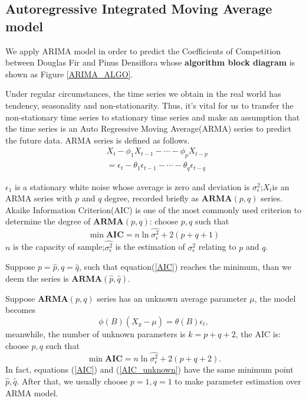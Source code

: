 \documentclass{mcmthesis}
\numberwithin{figure}{section}
\numberwithin{table}{section}
\numberwithin{equation}{section}
\begin{document}
\subsection{Autoregressive Integrated Moving Average model}

We apply ARIMA model in order to predict the Coefficients of Competition between 
Douglas Fir and Pinus Densiflora whose \textbf{algorithm block diagram} 
is shown as Figure \ref{ARIMA_ALGO}.
\par
Under regular circumstances, the time series we obtain in the real world
  has tendency, seasonality and non-stationarity. Thus, it's vital for 
  us to transfer the non-stationary time series to stationary time series
  and make an assumption that the time series is an Auto 
  Regressive Moving Average(ARMA) series to predict the 
  future data. ARMA series is defined as follows.
  \begin{align*}
    &X_t-\phi_1X_{t-1}-\cdots -\phi_pX_{t-p} \\
    &= \epsilon_t - \theta_1\epsilon_{t-1}-\cdots-\theta_q\epsilon_{t-q}
  \end{align*}
 
$ \epsilon_1 $ is a stationary white noise whose average is zero and
deviation is $ \sigma_\epsilon^2 $;$ X_t $is an ARMA series with $ p $ and $ q $
degree, recorded briefly as $ \mathbf{ARMA}(p,q) $ series.
Akaike Information Criterion(AIC) is one of the most commonly used
criterion to determine the degree of $ \mathbf{ARMA}(p,q) $: choose 
$ p,q $ such that 
\begin{equation}\label{AIC}
    \min \mathbf{AIC} = n\ln \hat{\sigma_\epsilon^2}+ 2(p+q+1)
\end{equation}
$ n $ is the capacity of sample;$ \hat{\sigma_\epsilon^2} $ is the
estimation of $ \sigma_\epsilon^2 $ relating to $ p $ and $ q $.
\par
Suppose $ p = \hat{p}, q = \hat{q} $, such that equation(\ref{AIC}) reaches the minimum,
than we deem the series is $ \mathbf{ARMA}(\hat{p},\hat{q}) $. 
\par
Suppose $ \mathbf{ARMA}(p,q) $ series has an unknown average parameter $ \mu $,
the model becomes
$$
  \phi(B)(X_y-\mu) = \theta(B)\epsilon_t,
$$   
meanwhile, the number of unknown parameters is $ k = p+q+2 $, the AIC is:
choose $ p,q $ such that
\begin{equation}\label{AIC_unknown}
  \min \mathbf{AIC} = n\ln\hat{\sigma_\epsilon^2}+2(p+q+2).
\end{equation}  
In fact, equations (\ref{AIC}) and (\ref{AIC_unknown}) have the same minimum point $ \hat{p},\hat{q} $.
After that, we usually choose $ p = 1, q = 1 $ to make parameter estimation 
over ARMA model.
\end{document}
